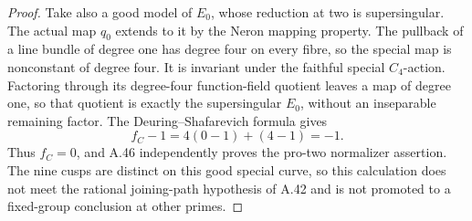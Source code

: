 \begin{proof}
Take also a good model of \(E_0\), whose reduction
at two is supersingular. The actual map \(q_0\)
extends to it by the Neron mapping property.
The pullback of a line bundle of degree one has
degree four on every fibre, so the special map is
nonconstant of degree four. It is invariant under
the faithful special \(C_4\)-action. Factoring
through its degree-four function-field quotient
leaves a map of degree one, so that quotient is
exactly the supersingular \(E_0\), without an
inseparable remaining factor. The Deuring--Shafarevich
formula \cite[formula (6), p.~5]{fghGiuliettiKorchmaros}
gives
\[
                  f_C-1=4(0-1)+(4-1)=-1.
                                                               \tag{A.50.21}
\]
Thus \(f_C=0\), and A.46 independently proves
the pro-two normalizer assertion. The nine cusps
are distinct on this good special curve, so this
calculation does not meet the rational joining-path
hypothesis of A.42 and is not promoted to a
fixed-group conclusion at other primes.
\end{proof}
